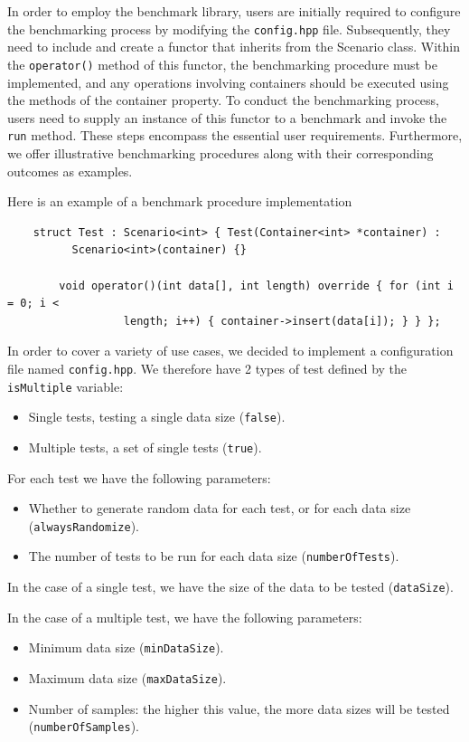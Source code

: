 \documentclass[conference]{IEEEtran} \IEEEoverridecommandlockouts \usepackage{graphicx}
\def\code#1{\texttt{#1}}
\begin{document}
In order to employ the benchmark library, users are initially required to configure the
benchmarking process by modifying the \code{config.hpp} file. Subsequently, they need to
include and create a functor that inherits from the Scenario class. Within the
\code{operator()} method of this functor, the benchmarking procedure must be implemented,
and any operations involving containers should be executed using the methods of the
container property. To conduct the benchmarking process, users need to supply an instance
of this functor to a benchmark and invoke the \code{run} method. These steps encompass the
essential user requirements. Furthermore, we offer illustrative benchmarking procedures
along with their corresponding outcomes as examples.

Here is an example of a benchmark procedure implementation
\begin{lstlisting}
	struct Test : Scenario<int> { Test(Container<int> *container) :
          Scenario<int>(container) {}
		
		void operator()(int data[], int length) override { for (int i = 0; i <
                  length; i++) { container->insert(data[i]); } } };
\end{lstlisting}

In order to cover a variety of use cases, we decided to implement a configuration file
named \code{config.hpp}. We therefore have 2 types of test defined by the
\code{isMultiple} variable:
\begin{itemize}
	\item Single tests, testing a single data size (\code{false}).
	\item Multiple tests, a set of single tests (\code{true}).
\end{itemize}

For each test we have the following parameters:
\begin{itemize}
	\item Whether to generate random data for each test, or for each data size
          (\code{alwaysRandomize}).
	\item The number of tests to be run for each data size (\code{numberOfTests}).
\end{itemize}

In the case of a single test, we have the size of the data to be tested (\code{dataSize}).

In the case of a multiple test, we have the following parameters:
\begin{itemize}
	\item Minimum data size (\code{minDataSize}).
	\item Maximum data size (\code{maxDataSize}).
	\item Number of samples: the higher this value, the more data sizes will be tested
          (\code{numberOfSamples}).
\end{itemize}
\end{document}
